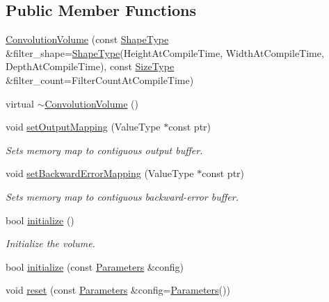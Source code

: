 \subsection*{Public Member Functions}
\begin{DoxyCompactItemize}
\item 
\hyperlink{classffnn_1_1layer_1_1_convolution_volume_a88d8d17c780f2b1bd3abe86c9daa432f}{Convolution\-Volume} (const \hyperlink{classffnn_1_1layer_1_1_convolution_volume_ae31080a107422dcfaff38eafadd69494}{Shape\-Type} \&filter\-\_\-shape=\hyperlink{classffnn_1_1layer_1_1_convolution_volume_ae31080a107422dcfaff38eafadd69494}{Shape\-Type}(Height\-At\-Compile\-Time, Width\-At\-Compile\-Time, Depth\-At\-Compile\-Time), const \hyperlink{classffnn_1_1layer_1_1_convolution_volume_abddc276f0405f5c0d70de3e43c2824d9}{Size\-Type} \&filter\-\_\-count=Filter\-Count\-At\-Compile\-Time)
\item 
virtual \hyperlink{classffnn_1_1layer_1_1_convolution_volume_abb83c5a7c16175e838a3cfdc98f8eb0c}{$\sim$\-Convolution\-Volume} ()
\item 
void \hyperlink{classffnn_1_1layer_1_1_convolution_volume_abf9ca7c7901a909ee924f3bca9e1f4cd}{set\-Output\-Mapping} (Value\-Type $\ast$const ptr)
\begin{DoxyCompactList}\small\item\em Sets memory map to contiguous output buffer. \end{DoxyCompactList}\item 
void \hyperlink{classffnn_1_1layer_1_1_convolution_volume_a2a823c2b00b1f62d6a6a616be653c266}{set\-Backward\-Error\-Mapping} (Value\-Type $\ast$const ptr)
\begin{DoxyCompactList}\small\item\em Sets memory map to contiguous backward-\/error buffer. \end{DoxyCompactList}\item 
bool \hyperlink{classffnn_1_1layer_1_1_convolution_volume_ae80c8f441de89f0ac4c089a17e43970c}{initialize} ()
\begin{DoxyCompactList}\small\item\em Initialize the volume. \end{DoxyCompactList}\item 
bool \hyperlink{classffnn_1_1layer_1_1_convolution_volume_a09808deb1aac6c1eb556de86838eef08}{initialize} (const \hyperlink{structffnn_1_1layer_1_1_convolution_volume_1_1_parameters}{Parameters} \&config)
\item 
void \hyperlink{classffnn_1_1layer_1_1_convolution_volume_adab425ba7e60e232ea4a3ccab49171d6}{reset} (const \hyperlink{structffnn_1_1layer_1_1_convolution_volume_1_1_parameters}{Parameters} \&config=\hyperlink{structffnn_1_1layer_1_1_convolution_volume_1_1_parameters}{Parameters}())

\end{DoxyCompactItemize}
